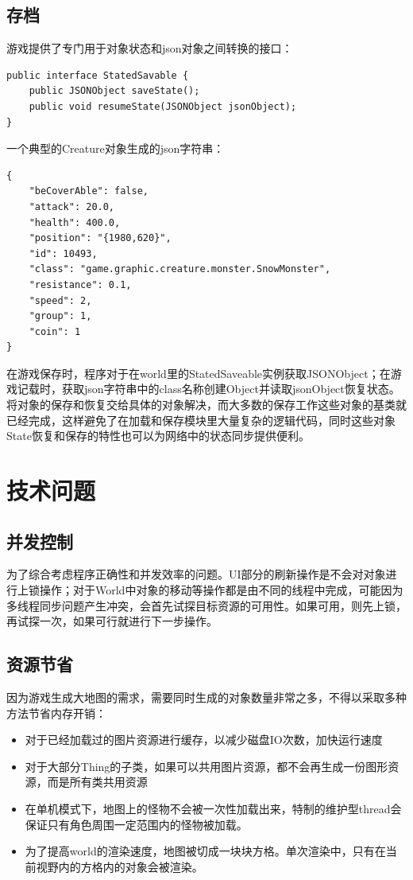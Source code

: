 \documentclass{SCIS2022cn}
\begin{document}
\subsection{存档}
游戏提供了专门用于对象状态和json对象之间转换的接口：\\
\begin{lstlisting}
public interface StatedSavable {
	public JSONObject saveState();
	public void resumeState(JSONObject jsonObject);
}
\end{lstlisting}
\par
一个典型的Creature对象生成的json字符串：\\
\begin{lstlisting}
{
	"beCoverAble": false,
	"attack": 20.0,
	"health": 400.0,
	"position": "{1980,620}",
	"id": 10493,
	"class": "game.graphic.creature.monster.SnowMonster",
	"resistance": 0.1,
	"speed": 2,
	"group": 1,
	"coin": 1
}
\end{lstlisting}
\par
在游戏保存时，程序对于在world里的StatedSaveable实例获取JSONObject；在游戏记载时，获取json字符串中的class名称创建Object并读取jsonObject恢复状态。将对象的保存和恢复交给具体的对象解决，而大多数的保存工作这些对象的基类就已经完成，这样避免了在加载和保存模块里大量复杂的逻辑代码，同时这些对象State恢复和保存的特性也可以为网络中的状态同步提供便利。
\section{技术问题}
\subsection{并发控制}
为了综合考虑程序正确性和并发效率的问题。UI部分的刷新操作是不会对对象进行上锁操作；对于World中对象的移动等操作都是由不同的线程中完成，可能因为多线程同步问题产生冲突，会首先试探目标资源的可用性。如果可用，则先上锁，再试探一次，如果可行就进行下一步操作。
\subsection{资源节省}
因为游戏生成大地图的需求，需要同时生成的对象数量非常之多，不得以采取多种方法节省内存开销：
\begin{itemize}
	\item 对于已经加载过的图片资源进行缓存，以减少磁盘IO次数，加快运行速度
	\item 对于大部分Thing的子类，如果可以共用图片资源，都不会再生成一份图形资源，而是所有类共用资源
	\item 在单机模式下，地图上的怪物不会被一次性加载出来，特制的维护型thread会保证只有角色周围一定范围内的怪物被加载。
	\item 为了提高world的渲染速度，地图被切成一块块方格。单次渲染中，只有在当前视野内的方格内的对象会被渲染。
\end{itemize}
\end{document}
